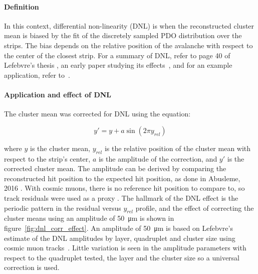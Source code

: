 \paragraph*{Definition} \hfill \break
In this context, differential non-linearity (DNL) is when the reconstructed cluster mean is biased by the fit of the discretely sampled PDO distribution over the strips. The bias depends on the relative position of the avalanche with respect to the center of the closest strip. For a summary of DNL, refer to page 40 of Lefebvre's thesis \cite{lefebvre_thesis}, an early paper studying its effects~\cite{endo_systematic_1981}, and for an example application, refer to~\cite{abusleme_performance_2016}. 

\paragraph*{Application and effect of DNL} \hfill \break
The cluster mean was corrected for DNL using the equation:

\begin{equation}
\label{eqn:dnl_corr}
y' = y + a \sin \left( 2 \pi y_{rel} \right)
\end{equation}

where $y$ is the cluster mean, $y_{rel}$ is the relative position of the cluster mean with respect to the strip's center, $a$ is the amplitude of the correction, and $y'$ is the corrected cluster mean. The amplitude can be derived by comparing the reconstructed hit position to the expected hit position, as done in Abusleme, 2016 \cite{abusleme_performance_2016}. With cosmic muons, there is no reference hit position to compare to, so track residuals were used as a proxy \cite{lefebvre_thesis}. The hallmark of the DNL effect is the periodic pattern in the residual versus $y_{rel}$ profile, and the effect of correcting the cluster means using an amplitude of \SI{50}{\micro\meter} is shown in figure~\ref{fig:dnl_corr_effect}. An amplitude of \SI{50}{\micro\meter} is based on Lefebvre's estimate of the DNL amplitudes by layer, quadruplet and cluster size using cosmic muon tracks~\cite{lefebvre_thesis}. Little variation is seen in the amplitude parameters with respect to the quadruplet tested, the layer and the cluster size so a universal correction is used.

